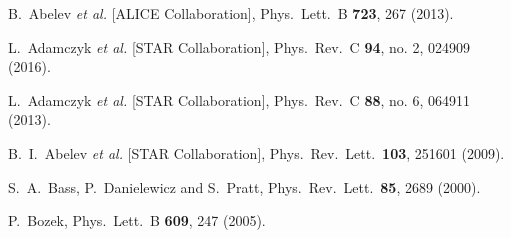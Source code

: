 \begin{thebibliography}{99}
  B.~Abelev {\it et al.} [ALICE Collaboration],
  Phys.\ Lett.\ B {\bf 723}, 267 (2013).


  L.~Adamczyk {\it et al.} [STAR Collaboration],
  Phys.\ Rev.\ C {\bf 94}, no. 2, 024909 (2016).

  L.~Adamczyk {\it et al.} [STAR Collaboration],
  Phys.\ Rev.\ C {\bf 88}, no. 6, 064911 (2013).

  B.~I.~Abelev {\it et al.} [STAR Collaboration],
  Phys.\ Rev.\ Lett.\  {\bf 103}, 251601 (2009).
	
  S.~A.~Bass, P.~Danielewicz and S.~Pratt,
  Phys.\ Rev.\ Lett.\  {\bf 85}, 2689 (2000).
	

  P.~Bozek,
  Phys.\ Lett.\ B {\bf 609}, 247 (2005).


\end{thebibliography}
